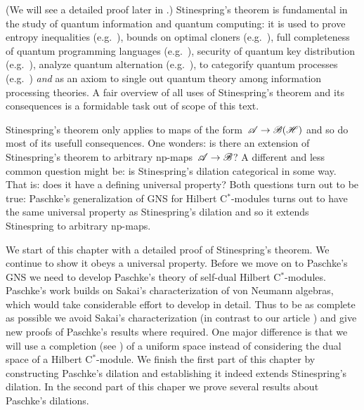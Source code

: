 \documentclass[b]{subfiles}
\begin{document}
\begin{parsec}
\begin{point}%
(We will see a detailed proof later in .)
Stinespring's theorem
is fundamental in the study
of quantum information and quantum computing:
it is used to prove entropy inequalities (e.g.~\cite{lindblad}),
bounds on optimal cloners (e.g.~\cite{werner}),
full completeness of quantum programming languages (e.g.~\cite{staton}),
security of quantum key distribution (e.g.~\cite{werner2,kissinger2017picture}),
analyze quantum alternation (e.g.~\cite{prakash}),
to categorify quantum processes (e.g.~\cite{selinger}) \emph{and}
as an axiom to single out
quantum theory among information processing theories.\cite{chiribella}
A fair overview of all uses of Stinespring's theorem and its consequences
is a formidable task out of scope of this text.

Stinespring's theorem only applies
to maps of the form~$\mathscr{A} \to \mathscr{B}(\mathscr{H})$
    and so do most of its usefull consequences.
One wonders:
    is there an extension of Stinespring's theorem
    to arbitrary np-maps~$\mathscr{A} \to \mathscr{B}$?
A different and less common question might be:
    is Stinespring's dilation categorical in some way.
That is: does it have a defining universal property?
Both questions turn out to be true:
Paschke's generalization of GNS for Hilbert C$^*$-modules\cite{paschke}
    turns out to have the same universal property
        as Stinespring's dilation and so it extends Stinespring
        to arbitrary np-maps.

We start of this chapter with a detailed proof of Stinespring's theorem.
We continue to show it obeys a universal property.
Before we move on to Paschke's GNS
    we need to develop Paschke's theory of self-dual Hilbert C$^*$-modules.
Paschke's work builds on Sakai's characterization of von Neumann algebras,
    which would take considerable effort to develop in detail.
Thus to be as complete as possible
we avoid Sakai's characterization (in contrast to our
    article \cite{wwpaschke})
    and give new proofs
    of Paschke's results where required.
One major difference is that we will use
    a completion (see ) of a uniform space
    instead of considering the dual space of a Hilbert C$^*$-module.
We finish the first part of this chapter
    by constructing Paschke's dilation
    and establishing it indeed extends Stinespring's dilation.
In the second part of this chaper
    we prove several results about Paschke's dilations.
\end{point}
\end{parsec}
\end{document}
